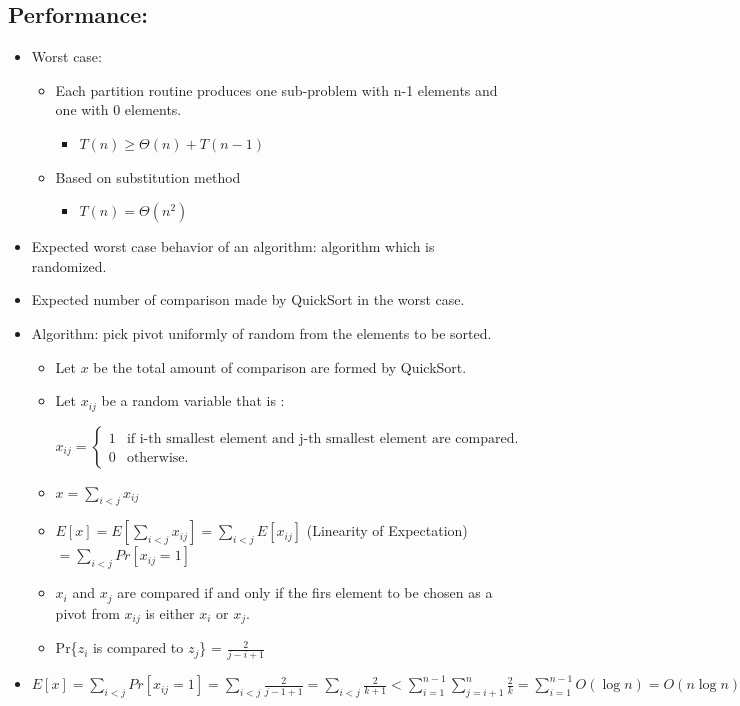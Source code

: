 \documentclass[en,hazy,blue,screen,14pt]{elegantnote}
\begin{document}
\subsection{Performance:}
\begin{itemize}
\item Worst case: 
\begin{itemize}
\item Each partition routine produces one sub-problem with n-1 elements
and one with 0 elements.
\begin{itemize}
\item $T(n)\ge\Theta(n)+T(n-1)$
\end{itemize}
\item Based on substitution method
\begin{itemize}
\item $T(n)=\Theta(n^{2})$
\end{itemize}
\end{itemize}
\item Expected worst case behavior of an algorithm: algorithm which is randomized.
\item Expected number of comparison made by QuickSort in the worst case.
\item Algorithm: pick pivot uniformly of random from the elements to be
sorted.
\begin{itemize}
\item Let $x$ be the total amount of comparison are formed by QuickSort. 
\item Let $x_{ij}$ be a random variable that is : 

$$x_{ij}=
\begin{cases}
1 & \text{if i-th smallest element and j-th smallest element are compared.}\\
0 & \text{otherwise.}
\end{cases}
$$
\item $x=\sum_{i<j}x_{ij}$
\item $E[x]=E[\sum_{i<j}x_{ij}]=\sum_{i<j}E[x_{ij}]$ (Linearity of Expectation)
$=\sum_{i<j}Pr[x_{ij}=1]$
\item $x_{i}$ and $x_{j}$ are compared if and only if the firs element
to be chosen as a pivot from $x_{ij}$ is either $x_{i}$ or $x_{j}$.
\item Pr\{$z_{i}$ is compared to $z_{j}$\} = $\frac{2}{j-i+1}$
\end{itemize}
\item $E[x]=\sum_{i<j}Pr[x_{ij}=1]=\sum_{i<j}\frac{2}{j-1+1}=\sum_{i<j}\frac{2}{k+1}<\sum_{i=1}^{n-1}\sum_{j=i+1}^{n}\frac{2}{k}=\sum_{i=1}^{n-1}O(\log n)=O(n\log n)$
\end{itemize}
\end{document}

